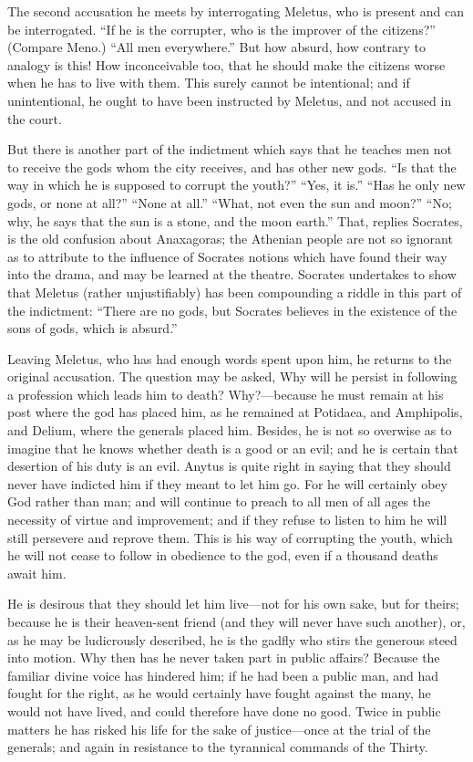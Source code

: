 \documentclass[11pt,letter]{article}
\begin{document}
\par  The second accusation he meets by interrogating Meletus, who is present and can be interrogated. “If he is the corrupter, who is the improver of the citizens?” (Compare Meno.) “All men everywhere.” But how absurd, how contrary to analogy is this! How inconceivable too, that he should make the citizens worse when he has to live with them. This surely cannot be intentional; and if unintentional, he ought to have been instructed by Meletus, and not accused in the court.

\par  But there is another part of the indictment which says that he teaches men not to receive the gods whom the city receives, and has other new gods. “Is that the way in which he is supposed to corrupt the youth?” “Yes, it is.” “Has he only new gods, or none at all?” “None at all.” “What, not even the sun and moon?” “No; why, he says that the sun is a stone, and the moon earth.” That, replies Socrates, is the old confusion about Anaxagoras; the Athenian people are not so ignorant as to attribute to the influence of Socrates notions which have found their way into the drama, and may be learned at the theatre. Socrates undertakes to show that Meletus (rather unjustifiably) has been compounding a riddle in this part of the indictment: “There are no gods, but Socrates believes in the existence of the sons of gods, which is absurd.”

\par  Leaving Meletus, who has had enough words spent upon him, he returns to the original accusation. The question may be asked, Why will he persist in following a profession which leads him to death? Why?—because he must remain at his post where the god has placed him, as he remained at Potidaea, and Amphipolis, and Delium, where the generals placed him. Besides, he is not so overwise as to imagine that he knows whether death is a good or an evil; and he is certain that desertion of his duty is an evil. Anytus is quite right in saying that they should never have indicted him if they meant to let him go. For he will certainly obey God rather than man; and will continue to preach to all men of all ages the necessity of virtue and improvement; and if they refuse to listen to him he will still persevere and reprove them. This is his way of corrupting the youth, which he will not cease to follow in obedience to the god, even if a thousand deaths await him.

\par  He is desirous that they should let him live—not for his own sake, but for theirs; because he is their heaven-sent friend (and they will never have such another), or, as he may be ludicrously described, he is the gadfly who stirs the generous steed into motion. Why then has he never taken part in public affairs? Because the familiar divine voice has hindered him; if he had been a public man, and had fought for the right, as he would certainly have fought against the many, he would not have lived, and could therefore have done no good. Twice in public matters he has risked his life for the sake of justice—once at the trial of the generals; and again in resistance to the tyrannical commands of the Thirty.
\end{document}

